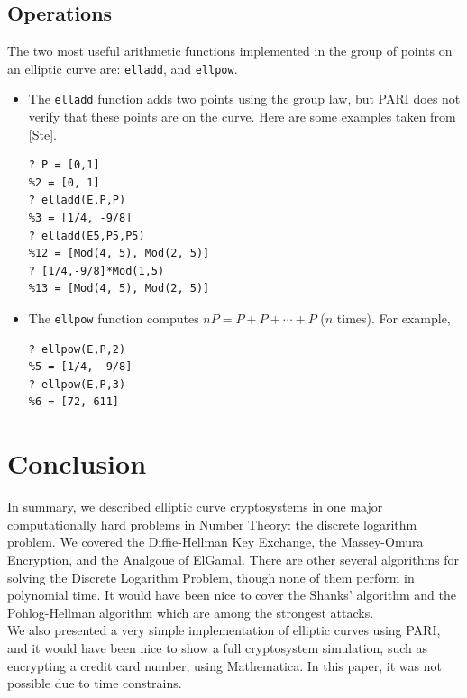 \documentclass[12pt]{article}
\begin{document}
\subsection{Operations}

The two most useful arithmetic functions implemented in 
the group of points on an elliptic curve are: {\tt elladd}, 
and {\tt ellpow}.\\ 

\begin{itemize}

\item The {\tt elladd} function adds two points 
using the group law, but PARI does not verify that these points are on the curve. Here are some examples taken from [Ste].
\begin{verbatim}
? P = [0,1]
%2 = [0, 1]
? elladd(E,P,P)
%3 = [1/4, -9/8]
? elladd(E5,P5,P5)
%12 = [Mod(4, 5), Mod(2, 5)]
? [1/4,-9/8]*Mod(1,5)
%13 = [Mod(4, 5), Mod(2, 5)]
\end{verbatim}
\item The {\tt ellpow} function computes $n P = P + P + \cdots + P$ ($n$ times). For example, 
\begin{verbatim}
? ellpow(E,P,2)
%5 = [1/4, -9/8]
? ellpow(E,P,3)
%6 = [72, 611]
\end{verbatim}

\end{itemize}


\section{Conclusion}

In summary, we described elliptic curve cryptosystems in one major computationally hard problems in Number Theory: the discrete logarithm problem. We covered the Diffie-Hellman Key Exchange, the Massey-Omura Encryption, and the Analgoue of ElGamal. There are other several algorithms for solving the Discrete Logarithm Problem, though none of them perform in polynomial time. It would have been nice to cover the Shanks' algorithm and the Pohlog-Hellman algorithm which are among the strongest attacks. \\

We also presented a very simple implementation of elliptic curves using PARI, and it would have been nice to show a full cryptosystem simulation, such as encrypting a credit card number, using Mathematica. In this paper, it was not possible due to time constrains. \\
\end{document}
